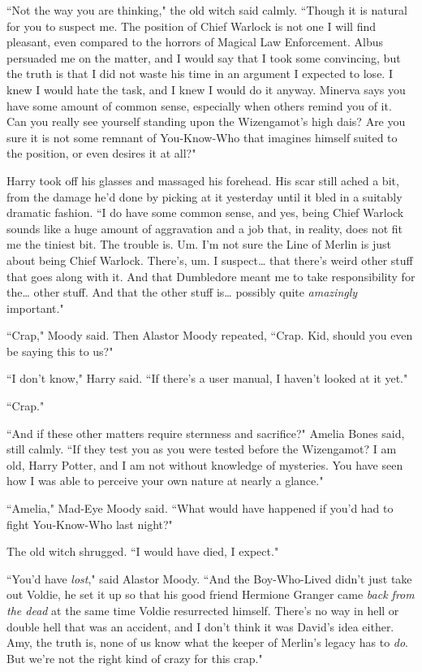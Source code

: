 ``Not the way you are thinking," the old witch said calmly. ``Though it is natural for you to suspect me. The position of Chief Warlock is not one I will find pleasant, even compared to the horrors of Magical Law Enforcement. Albus persuaded me on the matter, and I would say that I took some convincing, but the truth is that I did not waste his time in an argument I expected to lose. I knew I would hate the task, and I knew I would do it anyway. Minerva says you have some amount of common sense, especially when others remind you of it. Can you really see yourself standing upon the Wizengamot's high dais? Are you sure it is not some remnant of You-Know-Who that imagines himself suited to the position, or even desires it at all?"

Harry took off his glasses and massaged his forehead. His scar still ached a bit, from the damage he'd done by picking at it yesterday until it bled in a suitably dramatic fashion. ``I do have some common sense, and yes, being Chief Warlock sounds like a huge amount of aggravation and a job that, in reality, does not fit me the tiniest bit. The trouble is. Um. I'm not sure the Line of Merlin is just about being Chief Warlock. There's, um. I suspect{\ldots} that there's weird other stuff that goes along with it. And that Dumbledore meant me to take responsibility for the{\ldots} other stuff. And that the other stuff is{\ldots} possibly quite \emph{amazingly} important."

``Crap," Moody said. Then Alastor Moody repeated, ``Crap. Kid, should you even be saying this to us?"

``I don't know," Harry said. ``If there's a user manual, I haven't looked at it yet."

``Crap."

``And if these other matters require sternness and sacrifice?" Amelia Bones said, still calmly. ``If they test you as you were tested before the Wizengamot? I am old, Harry Potter, and I am not without knowledge of mysteries. You have seen how I was able to perceive your own nature at nearly a glance."

``Amelia," Mad-Eye Moody said. ``What would have happened if you'd had to fight You-Know-Who last night?"

The old witch shrugged. ``I would have died, I expect."

``You'd have \emph{lost}," said Alastor Moody. ``And the Boy-Who-Lived didn't just take out Voldie, he set it up so that his good friend Hermione Granger came \emph{back from the dead} at the same time Voldie resurrected himself. There's no way in hell or double hell that was an accident, and I don't think it was David's idea either. Amy, the truth is, none of us know what the keeper of Merlin's legacy has to \emph{do}. But we're not the right kind of crazy for this crap."

